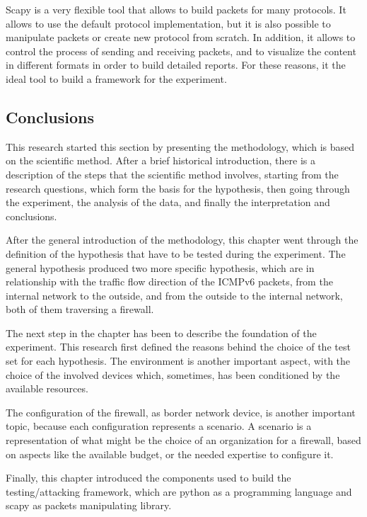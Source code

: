 \documentclass[12pt]{article}
\begin{document}
Scapy is a very flexible tool that allows to build packets for many protocols. It allows to use the default protocol implementation, but it is also possible to manipulate packets or create new protocol from scratch. In addition, it allows to control the process of sending and receiving packets, and to visualize the content in different formats in order to build detailed reports. For these reasons, it the ideal tool to build a framework for the experiment.

\subsection{Conclusions}
\label{sub:methConclusions}

This research started this section by presenting the methodology, which is based on the scientific method. After a brief historical introduction, there is a description of the steps that the scientific method involves, starting from the research questions, which form the basis for the hypothesis, then going through the experiment, the analysis of the data, and finally the interpretation and conclusions.

After the general introduction of the methodology, this chapter went through the definition of the hypothesis that have to be tested during the experiment. The general hypothesis produced two more specific hypothesis, which are in relationship with the traffic flow direction of the ICMPv6 packets, from the internal network to the outside, and from the outside to the internal network, both of them traversing a firewall.

The next step in the chapter has been to describe the foundation of the experiment. This research first defined the reasons behind the choice of the test set for each hypothesis. The environment is another important aspect, with the choice of the involved devices which, sometimes, has been conditioned by the available resources.

The configuration of the firewall, as border network device, is another important topic, because each configuration represents a scenario. A scenario is a representation of what might be the choice of an organization for a firewall, based on aspects like the available budget, or the needed expertise to configure it.

Finally, this chapter introduced the components used to build the testing/attacking framework, which are python as a programming language and scapy as packets manipulating library.
\end{document}

